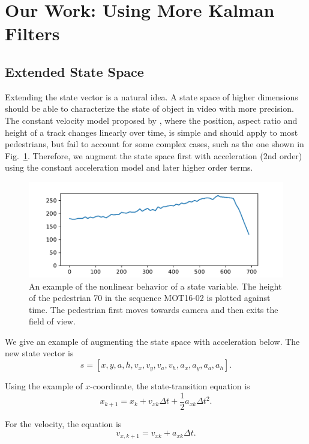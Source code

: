 \documentclass[conference]{IEEEtran}
\begin{document}
\section{Our Work: Using More Kalman Filters}
\label{sec:our-work}
\subsection{Extended State Space}

Extending the state vector is a natural idea. A state space of higher dimensions should be able to characterize the state of object in video with more precision. The constant velocity model proposed by \cite{Wojke2017simple}, where the position, aspect ratio and height of a track changes linearly over time, is simple and should apply to most pedestrians, but fail to account for some complex cases, such as the one shown in Fig.~\ref{fig:example-of-nonlinearity}. Therefore, we augment the state space first with acceleration (2nd order) using the constant acceleration model and later higher order terms.

\begin{figure}[h]
    \centering
    \includegraphics[width=\linewidth]{fig/accelerating-pedestrian-height-plot.pdf}
    \caption{An example of the nonlinear behavior of a state variable. The height of the pedestrian 70 in the sequence MOT16-02 is plotted against time. The pedestrian first moves towards camera and then exits the field of view.}
    \label{fig:example-of-nonlinearity}
\end{figure}

We give an example of augmenting the state space with acceleration below. The new state vector is
\[
    s = [x, y, a, h, v_x, v_y, v_a, v_h, a_x, a_y, a_a, a_h].
\]

Using the example of $x$-coordinate, the state-transition equation is
\[
    x_{k + 1} = x_k + v_{xk} \Delta t + \frac{1}{2} a_{xk} \Delta t^2.
\]

For the velocity, the equation is
\[
    v_{x, k + 1} = v_{xk} + a_{xk} \Delta t.
\]
\end{document}
